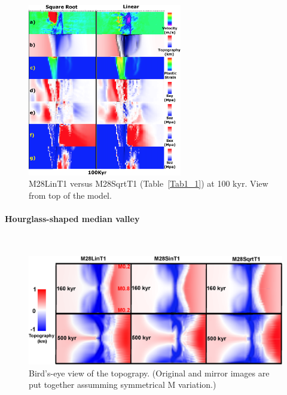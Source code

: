 \begin{figure}[h]
  \centering
    \includegraphics[width=0.6\textwidth]{./Figures/fig_Results4_3_sqrt_vs_lin_cut_back_100kyr.eps}
  \caption{M28LinT1 versus M28SqrtT1 (Table~\hyperref[Tab1_1]{\ref{Tab1_1}}) at 100 kyr. View from top of the model.}
 \label{fig_Results4_3_2}
\end{figure} 
\fi

\paragraph{Hourglass-shaped median valley}
~\\
\begin{figure}[h]
  \centering
    \includegraphics[width=1.0\textwidth]{./Figures/fig_Results_3_3_1_hourglass.eps}
  \caption[Bird's-eye view of the topograpy.]{Bird's-eye view of the topograpy. (Original and mirror images are put together assumming symmetrical M variation.) }
 \label{fig_Results_3_3_1_hourglass}
\end{figure} 

